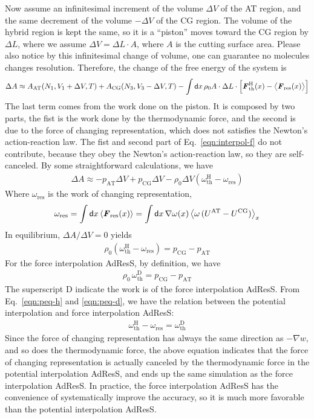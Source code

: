 \documentclass[aip,jcp,a4paper,reprint,onecolumn]{revtex4-1}
\newcommand{\vect}[1]{\textbf{\textit{#1}}}
\newcommand{\dd}[0]{\textsf{d}}
\newcommand{\AT}{{\textrm{{AT}}}}
\newcommand{\CG}{{\textrm{CG}}}
\newcommand{\thf}{{\textrm{th}}}
\newcommand{\res}{{\textrm{res}}}
\newcommand{\hadress}{{\textrm{H}}}
\newcommand{\dadress}{{\textrm{D}}}
\begin{document}
\noindent
Now assume an infinitesimal increment of the volume $\Delta V$ of the
AT region, and the same decrement of the volume $-\Delta V$ of the CG
region.  The volume of the hybrid region is kept the same,
so it is a ``piston''
moves toward the CG region by $\Delta L$,
where we assume $\Delta V = \Delta L\cdot A$, where $A$ is the
cutting surface area.
Please also notice by this infinitesimal change of volume, one can
guarantee no molecules changes resolution.
Therefore, the change of the free energy of the system is
\begin{align}
  \Delta A \approx
  A_\AT(N_1, V_1+\Delta V, T) +
  A_\CG(N_3, V_3-\Delta V, T) -
  \int\dd x\, \rho_0 A\cdot \Delta L\cdot
  \Big[
  \vect F^\hadress_\thf(x) -
  \big\langle \vect F_\res(x)\big\rangle
  \Big]
\end{align}
The last term comes from the work done on the piston. It is composed by
two parts, the fist is the work done by the thermodynamic force, and the
second is due to 
the force of changing representation, which does not satisfies the Newton's
action-reaction law. The fist and second part of Eq.~\eqref{eqn:interpol-f}
do not contribute, because they obey the Newton's action-reaction law, so
they are self-canceled.
By some straightforward calculations, we have 
\begin{align}\label{eqn:peq-d}
  \Delta A \approx
  -p_\AT\Delta V + p_\CG\Delta V -
  \rho_0 \Delta V (\omega_\thf^\hadress - \omega_\res)  
\end{align}
Where $ \omega_\res$ is the work of changing representation,
\begin{align}
  \omega_\res
  = \int\dd x\,\langle \vect F_\res (x)\rangle
  = \int\dd x\,\nabla\omega(x)\,
  \big\langle \omega\, (U^\AT - U^\CG)\big\rangle_x
\end{align}
In equilibrium, $\Delta A / \Delta V = 0$ yields
\begin{align}\label{eqn:peq-h}
  \rho_0 (\omega_\thf^\hadress - \omega_\res) = p_\CG - p_\AT
\end{align}
For the force interpolation AdResS, by definition, we have
\begin{align}\label{eqn:peq-d}
  \rho_0\, \omega_\thf^\dadress  = p_\CG - p_\AT  
\end{align}
The superscript D indicate the work is of the force interpolation AdResS.
From Eq.~\eqref{eqn:peq-h} and \eqref{eqn:peq-d}, we have the relation between
the potential interpolation and force interpolation AdResS:
\begin{align}\label{eqn:hd-rel}
  \omega_\thf^\hadress - \omega_\res =  \omega_\thf^\dadress 
\end{align}
Since the force of changing representation has always the same
direction as $-\nabla w$, and so does the thermodynamic force, the
above equation indicates that the force of changing representation is
actually canceled by the thermodynamic force in the potential
interpolation AdResS, and ends up the same simulation as the force
interpolation AdResS.  In practice, the force interpolation AdResS has
the convenience of systematically improve the accuracy,
so it is much more favorable than the potential interpolation
AdResS.
\end{document}
